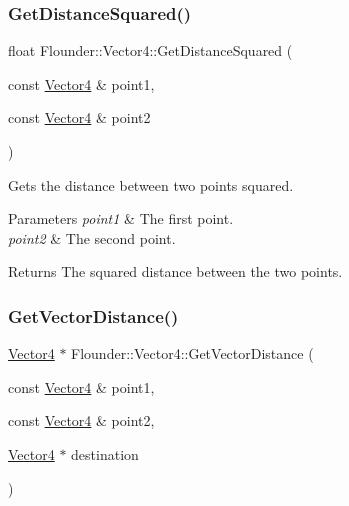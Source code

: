 \subsubsection{\texorpdfstring{Get\+Distance\+Squared()}{GetDistanceSquared()}}
{\footnotesize\ttfamily float Flounder\+::\+Vector4\+::\+Get\+Distance\+Squared (\begin{DoxyParamCaption}\item[{const \hyperlink{class_flounder_1_1_vector4}{Vector4} \&}]{point1,  }\item[{const \hyperlink{class_flounder_1_1_vector4}{Vector4} \&}]{point2 }\end{DoxyParamCaption})\hspace{0.3cm}{\ttfamily [static]}}



Gets the distance between two points squared. 


\begin{DoxyParams}{Parameters}
{\em point1} & The first point. \\
\hline
{\em point2} & The second point. \\
\hline
\end{DoxyParams}
\begin{DoxyReturn}{Returns}
The squared distance between the two points. 
\end{DoxyReturn}
\mbox{\label{class_flounder_1_1_vector4_a8bfd658586cf78a702ecb99fcda3ad41}} 
\subsubsection{\texorpdfstring{Get\+Vector\+Distance()}{GetVectorDistance()}}
{\footnotesize\ttfamily \hyperlink{class_flounder_1_1_vector4}{Vector4} $\ast$ Flounder\+::\+Vector4\+::\+Get\+Vector\+Distance (\begin{DoxyParamCaption}\item[{const \hyperlink{class_flounder_1_1_vector4}{Vector4} \&}]{point1,  }\item[{const \hyperlink{class_flounder_1_1_vector4}{Vector4} \&}]{point2,  }\item[{\hyperlink{class_flounder_1_1_vector4}{Vector4} $\ast$}]{destination }\end{DoxyParamCaption})\hspace{0.3cm}{\ttfamily [static]}}



